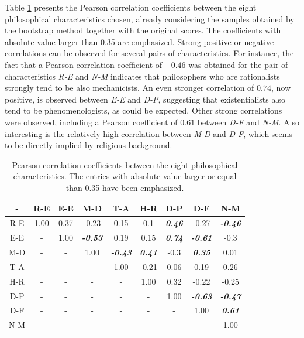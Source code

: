 \documentclass[%
 aip,
 jmp,%
 amsmath,amssymb,
 reprint,%
]{revtex4-1}
\begin{document}
Table \ref{tab:tableB} presents the Pearson correlation coefficients
between the eight philosophical characteristics chosen, already
considering the samples obtained by the bootstrap method together with
the original scores.  The
coefficients with absolute value larger than 0.35 are emphasized.
Strong positive or negative correlations can be observed for several
pairs of characteristics.  For instance, the fact that a Pearson
correlation coefficient of $-0.46$ was obtained for the pair of
characteristics \emph{R-E} and \emph{N-M} indicates that philosophers
who are rationalists strongly tend to be also mechanicists.  An even
stronger correlation of $0.74$, now positive, is observed between
\emph{E-E} and \emph{D-P}, suggesting that existentialists also tend
to be phenomenologists, as could be expected.  Other strong
correlations were observed, including a Pearson coefficient of $0.61$
between \emph{D-F} and \emph{N-M}.  Also interesting is the relatively
high correlation between \emph{M-D} and \emph{D-F}, which seems to be
directly implied by religious background.


\begin{table}\footnotesize%
\caption{\label{tab:tableB}Pearson correlation coefficients between the eight philosophical characteristics.  The entries with absolute
value larger or equal than 0.35 have been emphasized.}

\begin{ruledtabular}
\begin{tabular}{|c||c|c|c|c|c|c|c|c|}

- & R-E & E-E & M-D & T-A & H-R & D-P & D-F & N-M \\ \hline
R-E & 1.00 & 0.37 & -0.23 & 0.15 & 0.1 & {\bf \emph{  0.46}} & -0.27 & {\bf \emph{  -0.46}} \\
E-E & -    & 1.00 & {\bf \emph{  -0.53}} & 0.19 & 0.15 & {\bf \emph{  0.74}} & {\bf \emph{  -0.61}} & -0.3 \\
M-D & -    & -    & 1.00 & {\bf \emph{-0.43}} & {\bf \emph{  0.41}} & -0.3 & {\bf \emph{  0.35}} & 0.01 \\
T-A & -    & -    & -    & 1.00 & -0.21 & 0.06  & 0.19 & 0.26 \\
H-R & -    & -    & -    & -    & 1.00 & 0.32 & -0.22 & -0.25 \\ 
D-P & -    & -    & -    & -    & -    & 1.00 & {\bf \emph{  -0.63}}  & {\bf \emph{  -0.47}} \\
D-F & -    & -    & -    & -    & -    & -    & 1.00 & {\bf \emph{  0.61}} \\
N-M & -    & -    & -    & -    & -    & -    & -    & 1.00 \\

\end{tabular}
\end{ruledtabular}
\end{table}
\end{document}
